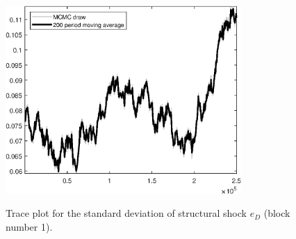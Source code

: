 \begin{figure}[H]
\centering
  \includegraphics[width=0.8\textwidth]{BRS_comovement/graphs/TracePlot_SE_e_D_blck_1}\\
    \caption{Trace plot for the standard deviation of structural shock ${e_D}$ (block number 1).}
\end{figure}

